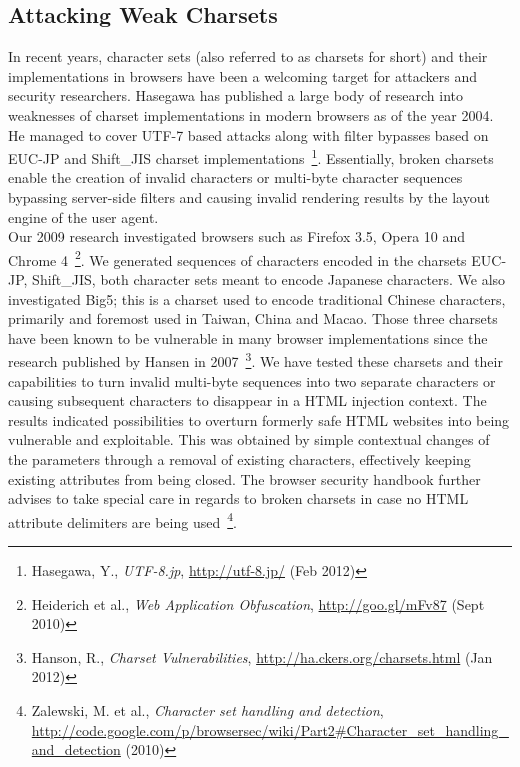     \subsection{Attacking Weak Charsets}
    \label{subsubsec:5.4.11.attacking_weak_charsets}

    In recent years, character sets (also referred to as charsets for short) and their implementations in browsers have been a welcoming target for attackers and security researchers. Hasegawa has published a large body of research into weaknesses of charset implementations in modern browsers as of the year 2004. He managed to cover UTF-7 based attacks along with filter bypasses based on EUC-JP and Shift\_JIS charset implementations~\footnote{Hasegawa, Y., \textit{UTF-8.jp}, \url{http://utf-8.jp/} (Feb 2012)}. Essentially, broken charsets enable the creation of invalid characters or multi-byte character sequences bypassing server-side filters and causing invalid rendering results by the layout engine of the user agent.\\ 

     Our 2009 research investigated browsers such as Firefox 3.5, Opera 10 and Chrome 4~\footnote{Heiderich et al., \textit{Web Application Obfuscation}, \url{http://goo.gl/mFv87} (Sept 2010)}. We generated sequences of characters encoded in the charsets EUC-JP, Shift\_JIS, both character sets meant to encode Japanese characters. We also investigated Big5; this is a charset used to encode traditional Chinese characters, primarily and foremost used in Taiwan, China and Macao. Those three charsets have been known to be vulnerable in many browser implementations since the research published by Hansen in 2007~\footnote{Hanson, R., \textit{Charset Vulnerabilities}, \url{http://ha.ckers.org/charsets.html} (Jan 2012)}. We have tested these charsets and their capabilities to turn invalid multi-byte sequences into two separate characters or causing subsequent characters to disappear in a HTML injection context. The results indicated possibilities to overturn formerly safe HTML websites into being vulnerable and 
exploitable. This was obtained by simple contextual changes of the parameters through a removal of existing characters, effectively keeping existing attributes from being closed. The browser security handbook further advises to take special care in regards to broken charsets in case no HTML attribute delimiters are being used~\footnote{Zalewski, M. et al., \textit{Character set handling and detection}, \url{http://code.google.com/p/browsersec/wiki/Part2#Character_set_handling_and_detection} (2010)}. \\

